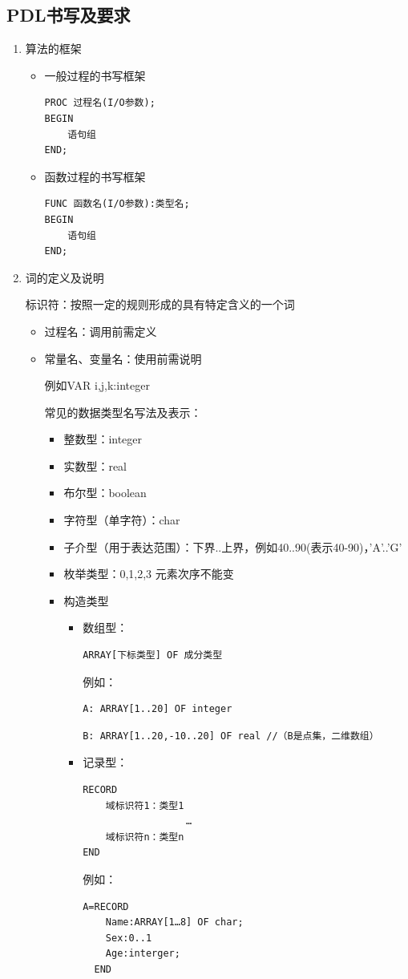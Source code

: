\documentclass[AutoFakeBold]{LZUThesis2007}
\begin{document}
		\subsection{PDL书写及要求}
			\begin{enumerate}
				\item 算法的框架
					\begin{itemize}
						\item 一般过程的书写框架
\begin{lstlisting}
PROC 过程名(I/O参数);
BEGIN
	语句组
END;
\end{lstlisting}
						\item 函数过程的书写框架
\begin{lstlisting}
FUNC 函数名(I/O参数):类型名;
BEGIN
	语句组
END;
\end{lstlisting}
					\end{itemize}
				\item 词的定义及说明

						标识符：按照一定的规则形成的具有特定含义的一个词
						\begin{itemize}
							\item 过程名：调用前需定义
							\item 常量名、变量名：使用前需说明

									例如VAR i,j,k:integer

									常见的数据类型名写法及表示：
									\begin{itemize}
										\item 整数型：integer
										\item 实数型：real
										\item 布尔型：boolean
										\item 字符型（单字符）：char
										\item 子介型（用于表达范围）：下界..上界，例如40..90(表示40-90)，'A'..'G'
										\item 枚举类型：{0,1,2,3}  元素次序不能变
										\item 构造类型
											\begin{itemize}
												\item 数组型：
\begin{lstlisting}
ARRAY[下标类型] OF 成分类型
\end{lstlisting}
												例如：
\begin{lstlisting}
A: ARRAY[1..20] OF integer
\end{lstlisting}
\begin{lstlisting}
B: ARRAY[1..20,-10..20] OF real	//（B是点集，二维数组）
\end{lstlisting}
												\item 记录型：
\begin{lstlisting}
RECORD
	域标识符1：类型1
	              …
	域标识符n：类型n
END
\end{lstlisting}
例如：
\begin{lstlisting}
A=RECORD
	Name:ARRAY[1…8] OF char;
	Sex:0..1
	Age:interger;
  END
\end{lstlisting}


\end{itemize}
\end{itemize}
\end{itemize}
\end{enumerate}
\end{document}
